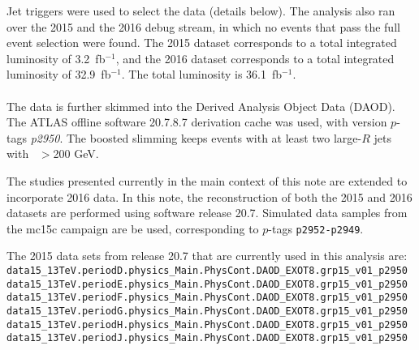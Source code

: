 Jet triggers were used to select the data (details below). The analysis also ran over the 2015 and the 2016 debug stream, in which no events that pass the full event selection were found. The 2015 dataset corresponds to a total integrated luminosity of 3.2\, fb$^{-1}$, and the 2016 dataset corresponds to a total integrated luminosity of 32.9\, fb$^{-1}$. The total luminosity is 36.1\, fb$^{-1}$.

\paragraph{}
The data is further skimmed into the Derived Analysis Object Data (DAOD). The ATLAS offline software 20.7.8.7 derivation cache was used, with version $p$-tags \textit{p2950}. The boosted slimming keeps events with at least two large-$R$ jets with \pt~$>$200 GeV.

The studies presented currently in the main context of this note are extended to incorporate 2016 data. In this note, the reconstruction of both the 2015 and 2016 datasets are performed using software release 20.7. Simulated data samples from the mc15c campaign are be used, corresponding to $p$-tags \texttt{p2952-p2949}.

The 2015 data sets from release 20.7 that are currently used in this analysis are:
\noindent
\\
{\scriptsize
\verb|data15_13TeV.periodD.physics_Main.PhysCont.DAOD_EXOT8.grp15_v01_p2950|\\
\verb|data15_13TeV.periodE.physics_Main.PhysCont.DAOD_EXOT8.grp15_v01_p2950|\\
\verb|data15_13TeV.periodF.physics_Main.PhysCont.DAOD_EXOT8.grp15_v01_p2950|\\
\verb|data15_13TeV.periodG.physics_Main.PhysCont.DAOD_EXOT8.grp15_v01_p2950|\\
\verb|data15_13TeV.periodH.physics_Main.PhysCont.DAOD_EXOT8.grp15_v01_p2950|\\
\verb|data15_13TeV.periodJ.physics_Main.PhysCont.DAOD_EXOT8.grp15_v01_p2950|
}

